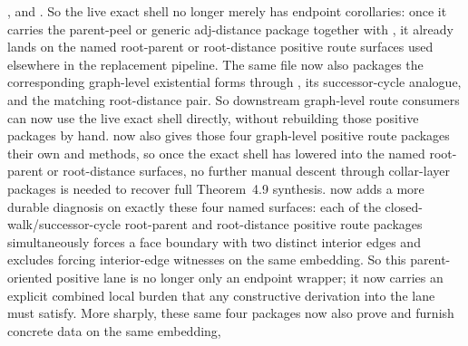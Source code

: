 \documentclass[11pt]{article}
\begin{document}
\begin{itemize}
,
and
.
So the live exact shell no longer merely has endpoint corollaries: once it
carries the parent-peel or generic adj-distance package together with
, it already lands on the named
root-parent or root-distance positive route surfaces used elsewhere in the
replacement pipeline.  The same file now also packages the corresponding
graph-level existential forms through
,
its successor-cycle analogue, and the matching root-distance pair.  So
downstream graph-level route consumers can now use the live exact shell
directly, without rebuilding those positive packages by hand.
 now also gives
those four graph-level positive route packages their own
 and  methods,
so once the exact shell has lowered into the named root-parent or
root-distance surfaces, no further manual descent through collar-layer
packages is needed to recover full Theorem~4.9 synthesis.
 now
adds a more durable diagnosis on exactly these four named surfaces: each of
the closed-walk/successor-cycle root-parent and root-distance positive route
packages simultaneously forces a face boundary with two distinct interior
edges and excludes forcing interior-edge witnesses on the same embedding.  So
this parent-oriented positive lane is no longer only an endpoint wrapper; it
now carries an explicit combined local burden that any constructive derivation
into the lane must satisfy.  More sharply, these same four packages now also
prove  and furnish
concrete  data on the same embedding,

\end{itemize}
\end{document}
